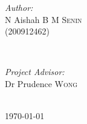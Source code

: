 \documentclass[12pt,a4paper,oneside]{report}
\begin{document}
\begin{titlepage}
\begin{minipage}{0.4\textwidth}
\begin{flushleft} \large
\emph{Author:}\\
N Aishah \textsc{B M Senin} \\ (200912462) %
\end{flushleft}
\end{minipage}
~
\begin{minipage}{0.4\textwidth}
\begin{flushright} \large
\emph{Project Advisor:} \\
Dr Prudence \textsc{Wong} %
\end{flushright}
\end{minipage}\\[2cm]



{\large \today}\\[3cm] %


 

\vfill %

\end{titlepage}

\tableofcontents







\todototoc
\listoftodos
\end{document}
